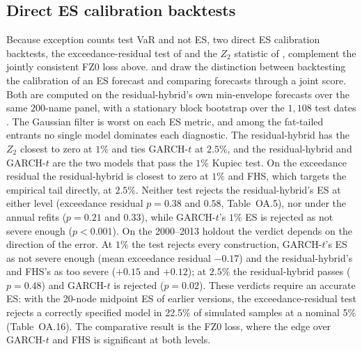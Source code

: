 \documentclass[11pt]{article}
\begin{document}
\subsection*{Direct ES calibration backtests}
Because exception counts test VaR and not ES,
two direct ES calibration backtests, the exceedance-residual test of \citet{mcneilfrey2000} and the $Z_2$ statistic of \citet{acerbi2014backtesting}, complement the jointly consistent FZ0 loss above. \citet{noldeziegel2017elicitability} and \citet{bayer2022esr} draw the
distinction between backtesting the calibration of an ES forecast and comparing
forecasts through a joint score. Both are computed on the residual-hybrid's own min-envelope forecasts over the same $200$-name panel, with a stationary block bootstrap over the $1{,}108$ test dates . The Gaussian filter is worst on each ES metric, and among the fat-tailed entrants no single model dominates each diagnostic. The residual-hybrid has the $Z_2$ closest to zero at $1\%$ and ties GARCH-$t$ at $2.5\%$, and the residual-hybrid and GARCH-$t$ are the two models that pass the $1\%$ Kupiec test. On the exceedance residual the residual-hybrid is closest to zero at $1\%$ and FHS, which targets the empirical tail directly, at $2.5\%$. Neither test rejects the residual-hybrid's ES at either level (exceedance residual $p=0.38$ and $0.58$, Table~OA.5), nor under the annual refits ($p=0.21$ and $0.33$), while GARCH-$t$'s $1\%$ ES is rejected as not severe enough ($p<0.001$). On the 2000--2013 holdout the verdict depends on the direction of the error. At $1\%$ the test rejects every construction, GARCH-$t$'s ES as not severe enough (mean exceedance residual $-0.17$) and the residual-hybrid's and FHS's as too severe ($+0.15$ and $+0.12$); at $2.5\%$ the residual-hybrid passes ($p=0.48$) and GARCH-$t$ is rejected ($p=0.02$). These verdicts require an accurate ES: with the 20-node midpoint ES of earlier versions, the exceedance-residual test rejects a correctly specified model in 22.5\% of simulated samples at a nominal 5\% (Table~OA.16). The comparative result is the FZ0 loss, where the edge over GARCH-$t$ and FHS is significant at both levels.
\end{document}
